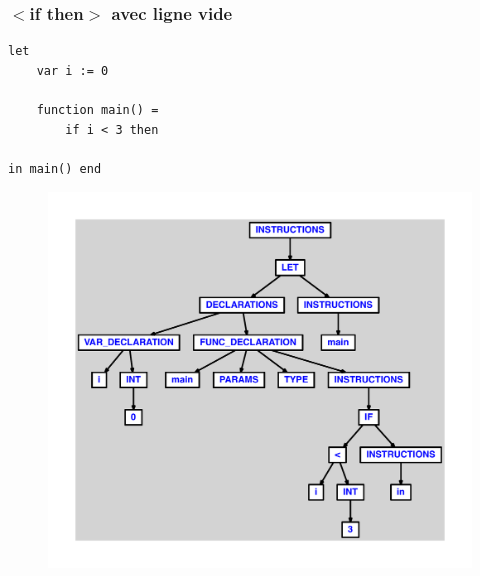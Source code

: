 \documentclass{article}
\begin{document}
\subsubsection{$ < $if then$ > $ avec ligne vide}
\begin{lstlisting}
let
	var i := 0

	function main() =
		if i < 3 then

in main() end
\end{lstlisting}
\newpage
\begin{figure}[H]
\centering
\includegraphics[max width=\textwidth]{ast/ast_259.pdf}
\end{figure}
\newpage
\end{document}
